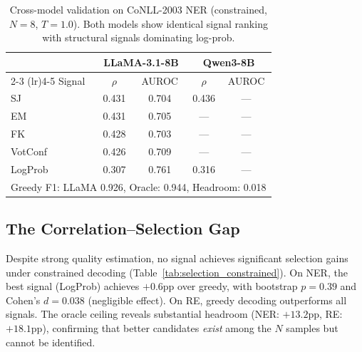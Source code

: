 \documentclass[11pt,a4paper]{article}
\begin{document}
\begin{table}[t]
\centering
\caption{Cross-model validation on CoNLL-2003 NER (constrained, $N\!=\!8$, $T\!=\!1.0$). Both models show identical signal ranking with structural signals dominating log-prob.}
\label{tab:crossmodel}
\small
\begin{tabular}{l cc cc}
\toprule
& \multicolumn{2}{c}{\textbf{LLaMA-3.1-8B}} & \multicolumn{2}{c}{\textbf{Qwen3-8B}} \\
\cmidrule(lr){2-3} \cmidrule(lr){4-5}
Signal & $\rho$ & AUROC & $\rho$ & AUROC \\
\midrule
SJ      & 0.431 & 0.704 & 0.436 & --- \\
EM      & 0.431 & 0.705 & --- & --- \\
FK      & 0.428 & 0.703 & --- & --- \\
VotConf & 0.426 & 0.709 & --- & --- \\
LogProb & 0.307 & 0.761 & 0.316 & --- \\
\midrule
\multicolumn{5}{l}{\small Greedy F1: LLaMA 0.926, Oracle: 0.944, Headroom: 0.018} \\
\bottomrule
\end{tabular}
\end{table}

\subsection{The Correlation--Selection Gap}
\label{sec:gap}

Despite strong quality estimation, no signal achieves significant selection gains under constrained decoding (Table~\ref{tab:selection_constrained}). On NER, the best signal (LogProb) achieves $+0.6$pp over greedy, with bootstrap $p = 0.39$ and Cohen's $d = 0.038$ (negligible effect). On RE, greedy decoding outperforms all signals. The oracle ceiling reveals substantial headroom (NER: $+13.2$pp, RE: $+18.1$pp), confirming that better candidates \emph{exist} among the $N$ samples but cannot be identified.
\end{document}
